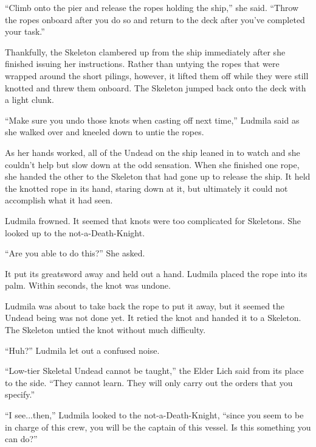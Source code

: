  

“Climb onto the pier and release the ropes holding the ship,” she said. “Throw the ropes onboard after you do so and return to the deck after you’ve completed your task.”

 

Thankfully, the Skeleton clambered up from the ship immediately after she finished issuing her instructions. Rather than untying the ropes that were wrapped around the short pilings, however, it lifted them off while they were still knotted and threw them onboard. The Skeleton jumped back onto the deck with a light clunk.

 

“Make sure you undo those knots when casting off next time,” Ludmila said as she walked over and kneeled down to untie the ropes.

 

As her hands worked, all of the Undead on the ship leaned in to watch and she couldn’t help but slow down at the odd sensation. When she finished one rope, she handed the other to the Skeleton that had gone up to release the ship. It held the knotted rope in its hand, staring down at it, but ultimately it could not accomplish what it had seen.

 

Ludmila frowned. It seemed that knots were too complicated for Skeletons. She looked up to the not-a-Death-Knight.

 

“Are you able to do this?” She asked.

 

It put its greatsword away and held out a hand. Ludmila placed the rope into its palm. Within seconds, the knot was undone.

 

Ludmila was about to take back the rope to put it away, but it seemed the Undead being was not done yet. It retied the knot and handed it to a Skeleton. The Skeleton untied the knot without much difficulty.

 

“Huh?” Ludmila let out a confused noise.

 

“Low-tier Skeletal Undead cannot be taught,” the Elder Lich said from its place to the side. “They cannot learn. They will only carry out the orders that you specify.”

 

“I see...then,” Ludmila looked to the not-a-Death-Knight, “since you seem to be in charge of this crew, you will be the captain of this vessel. Is this something you can do?”

